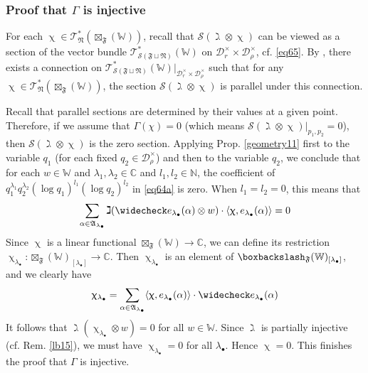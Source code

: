 \documentclass[11pt,b5paper,notitlepage]{article}
\theoremstyle{definition}
\theoremstyle{plain}
\newcommand{\fk}{\mathfrak}
\newcommand{\wch}{\widecheck}
\newcommand{\blt}{\bullet}
\newcommand{\Wbb}{\mathbb W}
\newcommand{\Cbb}{\mathbb C}
\newcommand{\Nbb}{\mathbb N}
\newcommand{\<}{\left\langle}
\renewcommand{\>}{\right\rangle}
\newcommand{\ST}{\mathscr{T}}
\newcommand{\MD}{\mathcal{D}}
\newcommand{\MS}{\mathcal{S}}
\newcommand{\bk}[1]{\langle {#1}\rangle}
\newcommand{\bbs}{\boxbackslash}
\newcommand{\fn}{\mathfrak{N}}
\newcommand{\ff}{\mathfrak{F}}
\numberwithin{equation}{section}
\begin{document}
\subsubsection{Proof that $\Gamma$ is injective}



For each $\upchi\in\ST^*_\fn(\boxtimes_\ff(\Wbb))$, recall that $\MS(\gimel\otimes\upchi)$ can be viewed as a section of the vector bundle $\ST^*_{\MS(\ff\sqcup\fn)}(\Wbb)$ on $\MD^\times_r\times\MD^\times_\rho$, cf. \eqref{eq65}. By \cite[Thm. 4.11]{GZ2}, there exists a connection on $\ST^*_{\MS(\ff\sqcup\fn)}(\Wbb)|_{\MD^\times_r\times\MD^\times_\rho}$ such that for any $\upchi\in\ST^*_\fn(\boxtimes_\ff(\Wbb))$, the section $\MS(\gimel\otimes\upchi)$ is parallel under this connection. 

Recall that parallel sections are determined by their values at a given point. Therefore, if we assume that $\Gamma(\chi)=0$ (which means $\MS(\gimel\otimes\upchi)|_{p_1,p_2}=0$), then  $\MS(\gimel\otimes\upchi)$ is the zero section. Applying Prop. \ref{geometry11} first to the variable $q_1$ (for each fixed $q_2\in\MD_\rho^\times$) and then to the variable $q_2$, we conclude that for each $w\in\Wbb$ and $\lambda_1,\lambda_2\in\Cbb$ and $l_1,l_2\in\Nbb$, the coefficient of $q_1^{\lambda_1}q_2^{\lambda_2}(\log q_1)^{l_1}(\log q_2)^{l_2}$ in \eqref{eq64a} is zero. When $l_1=l_2=0$, this means that
\begin{align*}
\sum_{\alpha\in\fk A_{\lambda_\blt}}\gimel(\wch e_{\lambda_\blt}(\alpha)\otimes w)\cdot\bk{\upchi,e_{\lambda_\blt}(\alpha)}=0
\end{align*}
Since $\upchi$ is a linear functional $\boxtimes_\ff(\Wbb)\rightarrow\Cbb$, we can define its restriction $\upchi_{\lambda_\blt}:\boxtimes_\ff(\Wbb)_{[\lambda_\blt]}\rightarrow\Cbb$. Then $\upchi_{\lambda_\blt}$ is an element of $\bbs_\ff(\Wbb)_{[\lambda_\blt]}$, and we clearly have
\begin{align*}
\upchi_{\lambda_\blt}=\sum_{\alpha\in\fk A_{\lambda_\blt}}\bk{\upchi,e_{\lambda_\blt}(\alpha)}\cdot \wch e_{\lambda_\blt}(\alpha)
\end{align*}
It follows that $\gimel(\upchi_{\lambda_\blt}\otimes w)=0$ for all $w\in\Wbb$. Since $\gimel$ is partially injective (cf. Rem. \ref{lb15}), we must have $\upchi_{\lambda_\blt}=0$ for all $\lambda_\blt$. Hence $\upchi=0$. This finishes the proof that $\Gamma$ is injective.
\end{document}
